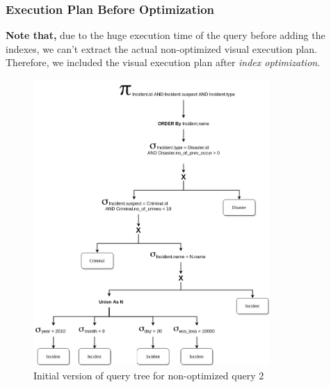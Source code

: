 \subsubsection{Execution Plan Before Optimization}
\textbf{Note that,} due to the huge execution time of the query before adding the indexes, we can't extract the actual non-optimized visual execution plan. Therefore, we included the visual execution plan after \emph{index optimization}.
\begin{figure}[H]
    \centering
    \includegraphics[width=0.8\textwidth]{images/query_trees/query2-non-optimized-initial-version.png}
    \caption{Initial version of query tree for non-optimized query 2}
\end{figure}
